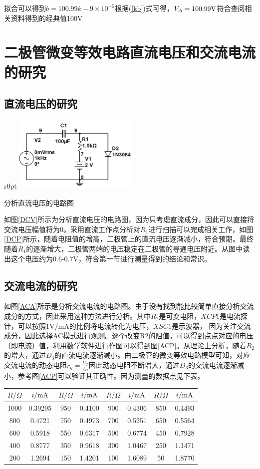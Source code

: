\documentclass[UTF8,a4paper]{ctexart}
\begin{document}
拟合可以得到$b=100.99k-9\times 10^{-5}$根据(\ref{kb})式可得，$V_A=100.99 \rm{V}$符合查阅相关资料得到的经典值100V

\section{二极管微变等效电路直流电压和交流电流的研究}
\subsection{直流电压的研究}
\begin {wrapfigure}{r}{0pt}
\includegraphics [width=60mm]{cap/10.JPG}
\caption{分析直流电压的电路图}
\label{DCV}
\end {wrapfigure}
如图\ref{DCV}所示为分析直流电压的电路图，因为只考虑直流成分，因此可以直接将交流电压幅值将为0。采用直流工作点分析对$R_1$进行扫描可以完成相关工作，如图\ref{DCP}所示，随着电阻值的增高，二极管上的直流电压逐渐减小，符合预期。最终随着$R_1$的逐渐增大，二极管两端的电压稳定在二极管的导通电压附近。从图中读出这个电压约为0.6-0.7V，符合第一节进行测量得到的结论和常识。


\subsection{交流电流的研究}

如图\ref{ACA}所示是分析交流电流的电路图。由于没有找到能比较简单直接分析交流成分的方式，因此采用这种方法进行分析。其中$R_2$是可变电阻，$XCP1$是电流探针，可以按照1V/mA的比例将电流转化为电压，$XSC1$是示波器， 因为关注交流成分，因此选择AC模式进行观测。逐个改变R2的阻值，可以得到点点对应的电压（即电流）值，利用数学软件进行作图可以得到图\ref{ACP}。从理论上分析，随着$R_2$的增大，通过$D_3$的直流电流逐渐减小。由二极管的微变等效电路模型可知，对应交流电流的动态电阻$r_g=\frac{U_T}{I_D}$因此动态电阻不断增大，通过$D_3$的交流电流逐渐减小，参考图\ref{ACP}可以验证其正确性。因为测量的数据点见下表。\\

\begin{tabular}{|c|c|c|c|c|c|c|c|}
\hline
$R/\Omega$&$i/\rm{mA}$&$R/\Omega$&$i/\rm{mA}$&$R/\Omega$&$i/\rm{mA}$&$R/\Omega$&$i/\rm{mA}$\\
\hline
1000&0.39295&950&0.4100&900&0.4306&850&0.4493\\
\hline
800&0.4721&750&0.4973&700&0.5251&650&0.5564\\
\hline
600&0.5918&550&0.6317&500&0.6774&450&0.7928\\
\hline
400&0.8777&350&0.9618&300&1.0467&250&1.1471\\
\hline
200&1.2694&150&1.4201&100&1.6089&50&1.8770\\
\hline
\end{tabular}
\end{document}
